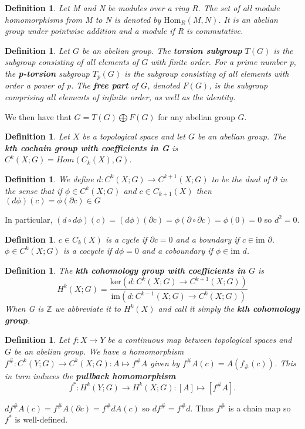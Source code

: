 \documentclass{article}
\newtheorem{definition}[theorem]{Definition}
\begin{document}
\begin{definition}
Let M and N be modules over a ring R. The set of all module homomorphisms from M to N is denoted by $\text{Hom}_R(M,N)$. It is an abelian group under pointwise addition and a module if R is commutative.
\end{definition}

\begin{definition}
Let $G$ be an abelian group. The \textbf{torsion subgroup} $T(G)$ is the subgroup consisting of all elements of $G$ with finite order. For a prime number p, the \textbf{p-torsion} subgroup $T_p(G)$ is the subgroup consisting of all elements with order a power of p. The \textbf{free part} of $G$, denoted $F(G)$, is the subgroup comprising all elements of infinite order, as well as the identity.
\end{definition}

\noindent We then have that $G=T(G)\bigoplus F(G)$ for any abelian group $G$.


\begin{definition}
Let $X$ be a topological space and let $G$ be an abelian group. The \textbf{kth cochain group with coefficients in G} is $C^k(X;G)=Hom(C_k(X),G)$. 
\end{definition}

\begin{definition}
We define $d\colon C^k(X;G)\to C^{k+1}(X;G)$ to be the dual of $\partial$ in the sense that if $\phi\in C^k(X;G)$ and $c\in C_{k+1}(X)$ then $(d\phi)(c)=\phi(\partial c)\in G$
\end{definition}

\noindent In particular, $(d\circ d\phi)(c)=(d\phi)(\partial c)=\phi(\partial\circ\partial c)=\phi(0)=0$ so $d^2=0$.

\begin{definition}
$c\in C_k(X)$ is a cycle if $\partial c=0$ and a boundary if $c\in\text{im }\partial$.
$\phi\in C^k(X;G)$ is a cocycle if $d\phi=0$ and a coboundary if $\phi\in\text{im }d$.
\end{definition}

\begin{definition}
The \textbf{kth cohomology group with coefficients in $G$} is \[H^k(X;G)=\frac{\text{ker}(d\colon C^k(X;G)\to C^{k+1}(X;G))}{\text{im}(d\colon C^{k-1}(X;G)\to C^k(X;G))}\] When G is $\mathbb{Z}$ we abbreviate it to $H^k(X)$ and call it simply the \textbf{kth cohomology group}.
\end{definition}

\begin{definition}
Let $f\colon X\to Y$ be a continuous map between topological spaces and $G$ be an abelian group. We have a homomorphism $f^\#\colon C^k(Y;G)\to C^k(X;G):A\mapsto f^\# A$ given by $f^\# A(c)=A(f_\#(c))$. This in turn induces the \textbf{pullback homomorphism} \[f^*\colon H^k(Y;G)\to H^k(X;G):[A]\mapsto [f^\# A].\]
\end{definition}
\noindent $df^\# A(c)=f^\# A(\partial c)=f^\# dA(c)$ so $df^\#=f^\# d$. Thus $f^\#$ is a chain map so $f^*$ is well-defined.
\end{document}
